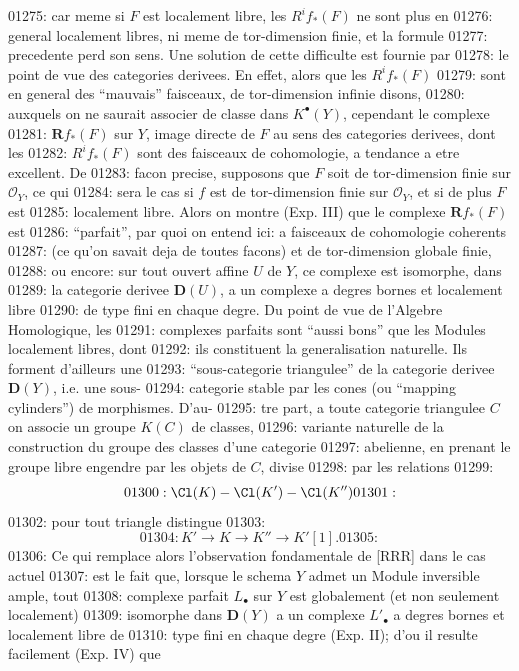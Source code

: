 01275: car meme si $F$ est localement libre, les $R^i f_{*}(F)$ ne sont plus en
01276: general localement libres, ni meme de tor-dimension finie, et la formule
01277: precedente perd son sens. Une solution de cette difficulte est fournie par
01278: le point de vue des categories derivees. En effet, alors que les $R^i f_{*}(F)$
01279: sont en general des ``mauvais'' faisceaux, de tor-dimension infinie disons,
01280: auxquels on ne saurait associer de classe dans $K^{\bullet}(Y)$, cependant le complexe
01281: $\mathbf{R}f_{*}(F)$ sur $Y$, image directe de $F$ au sens des categories derivees, dont les
01282: $R^i f_{*}(F)$ sont des faisceaux de cohomologie, a tendance a etre excellent. De
01283: facon precise, supposons que $F$ soit de tor-dimension finie sur $\mathcal{O}_Y$, ce qui
01284: sera le cas si $f$ est de tor-dimension finie sur $\mathcal{O}_Y$, et si de plus $F$ est
01285: localement libre. Alors on montre (Exp. III) que le complexe $\mathbf{R}f_{*}(F)$ est
01286: ``parfait'', par quoi on entend ici: a faisceaux de cohomologie coherents
01287: (ce qu'on savait deja de toutes facons) et de tor-dimension globale finie,
01288: ou encore: sur tout ouvert affine $U$ de $Y$, ce complexe est isomorphe, dans
01289: la categorie derivee $\mathbf{D}(U)$, a un complexe a degres bornes et localement libre
01290: de type fini en chaque degre. Du point de vue de l'Algebre Homologique, les
01291: complexes parfaits sont ``aussi bons'' que les Modules localement libres, dont
01292: ils constituent la generalisation naturelle. Ils forment d'ailleurs une
01293: ``sous-categorie triangulee'' de la categorie derivee $\mathbf{D}(Y)$, i.e. une sous-
01294: categorie stable par les cones (ou ``mapping cylinders'') de morphismes. D'au-
01295: tre part, a toute categorie triangulee $C$ on associe un groupe $K(C)$ de classes,
01296: variante naturelle de la construction du groupe des classes d'une categorie
01297: abelienne, en prenant le groupe libre engendre par les objets de $C$, divise
01298: par les relations
01299: \[
01300: \Cl(K) - \Cl(K') - \Cl(K'')
01301: \]
01302: pour tout triangle distingue
01303: \[
01304: K' \longrightarrow K \longrightarrow K'' \longrightarrow K'[1].
01305: \]
01306: Ce qui remplace alors l'observation fondamentale de [RRR] dans le cas actuel
01307: est le fait que, lorsque le schema $Y$ admet un Module inversible ample, tout
01308: complexe parfait $L_{\bullet}$ sur $Y$ est globalement (et non seulement localement)
01309: isomorphe dans $\mathbf{D}(Y)$ a un complexe $L'_{\bullet}$ a degres bornes et localement libre de
01310: type fini en chaque degre (Exp. II); d'ou il resulte facilement (Exp. IV) que

